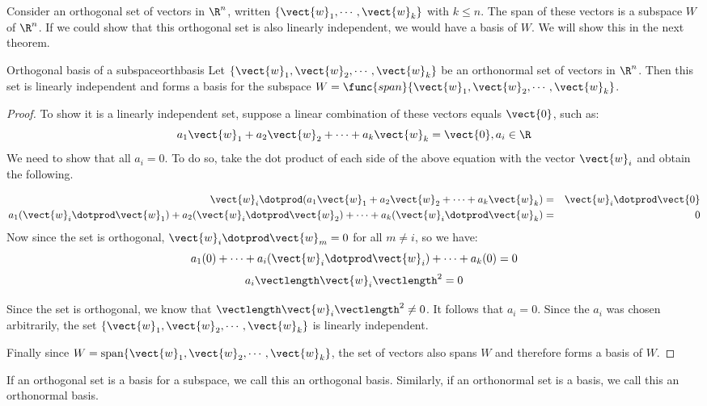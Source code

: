 Consider an orthogonal set of vectors in $\R^n$, written $\{
\vect{w}_1, \cdots, \vect{w}_k\}$ with $k \leq n$. The span of these
vectors is a subspace $W$ of $\R^n$. If we
could show that this orthogonal set is also linearly independent, we
would have a basis of $W$. We will show this in the next theorem.

\begin{theorem}{Orthogonal basis of a subspace}{orthbasis}
Let $ \{\vect{w}_1, \vect{w}_2, \cdots, \vect{w}_k\}$ be an
orthonormal set of vectors in $\R^n$. Then this set is
linearly independent and forms a basis for the subspace $W =
\func{span} \{\vect{w}_1, \vect{w}_2, \cdots, \vect{w}_k\}$.
\end{theorem}

\begin{proof}
To show it is a linearly independent set, suppose a linear combination
of these vectors equals $\vect{0}$, such as:
\[
a_1 \vect{w}_1 + a_2 \vect{w}_2 + \cdots + a_k \vect{w}_k = \vect{0}, a_i \in \R 
\]
We need to show that all $a_i = 0$. To do so, take the dot product of
each side of the above equation with the vector $\vect{w}_i$ and obtain the following. 

\begin{eqnarray*}
\vect{w}_i \dotprod (a_1 \vect{w}_1 + a_2 \vect{w}_2 + \cdots + a_k \vect{w}_k ) &=& \vect{w}_i \dotprod \vect{0}\\
a_1 (\vect{w}_i \dotprod \vect{w}_1) + a_2 (\vect{w}_i \dotprod \vect{w}_2) + \cdots + a_k (\vect{w}_i \dotprod \vect{w}_k)  &=& 0 
\end{eqnarray*}
Now since the set is orthogonal, $\vect{w}_i \dotprod \vect{w}_m = 0$ for all $m \neq i$, so we have:
\[
a_1 (0) + \cdots + a_i(\vect{w}_i \dotprod \vect{w}_i) + \cdots + a_k (0) = 0
\]
\[
a_i \vectlength \vect{w}_i \vectlength^2 = 0
\]

Since the set is orthogonal, we know that $\vectlength \vect{w}_i \vectlength^2  \neq 0$. It follows that $a_i =0$. Since the $a_i$ was chosen arbitrarily, the set $\{\vect{w}_1, \vect{w}_2, \cdots, \vect{w}_k\}$ is linearly independent. 

Finally since $W = \mbox{span} \{\vect{w}_1, \vect{w}_2, \cdots,
\vect{w}_k\}$, the set of vectors also spans $W$ and therefore forms a basis of $W$. 

\end{proof}

If an orthogonal set is a basis for a subspace, we call this an
orthogonal basis. Similarly, if an orthonormal set is a basis, we call
this an orthonormal basis.

